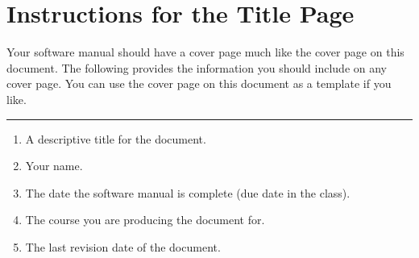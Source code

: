 
\section{\bf Instructions for the Title Page}

Your software manual should have a cover page much like the cover page on this
document. The following provides the information you should include on any cover
page. You can use the cover page on this document as a template if you like.

\vskip0.25in\hrule\vskip0.25in

\begin{enumerate}
  \item A descriptive title for the document.
  \item Your name.
  \item The date the software manual is complete (due date in the class).
  \item The course you are producing the document for.
  \item The last revision date of the document.
\end{enumerate}

\newpage
